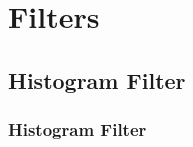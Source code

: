 \documentclass[letterpaper,10pt,english]{sphinxmanual}
\begin{document}
\sphinxstepscope


\section{Filters}
\label{\detokenize{Filters:filters}}\label{\detokenize{Filters::doc}}

\subsection{Histogram Filter}
\label{\detokenize{Filters:histogram-filter}}
\sphinxstepscope


\subsubsection{Histogram Filter}
\label{\detokenize{HF:histogram-filter}}\label{\detokenize{HF::doc}}
\begin{figure}[htbp]
\centering

\noindent{}
\end{figure}
\end{document}
